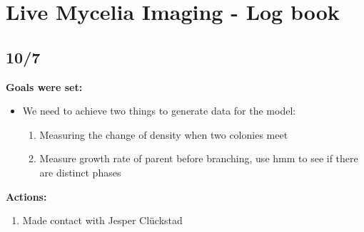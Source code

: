 \section{Live Mycelia Imaging - Log book}
\subsection{10/7}
\textbf{Goals were set:}
\begin{itemize}
    \item We need to achieve two things to generate data for the model:
    \begin{enumerate}
        \item Measuring the change of density when two colonies meet
        \item Measure growth rate of parent before branching, use hmm to see if there are distinct phases
    \end{enumerate}
\end{itemize}
\textbf{Actions:}
\begin{enumerate}
    \item Made contact with Jesper Clückstad
\end{enumerate}
